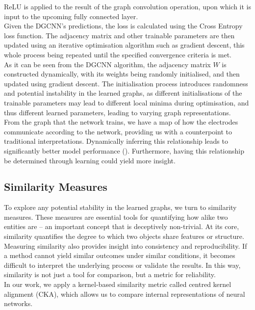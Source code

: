 \vspace{0.5em}
\noindent ReLU is applied to the result of the graph convolution operation, upon which it is input to the upcoming fully connected layer.
\vspace{0.5em}\\
Given the DGCNN's predictions, the loss is calculated using the Cross Entropy loss function. The adjacency matrix and other trainable parameters are then updated using an iterative optimisation algorithm such as gradient descent, this whole process being repeated until the specified convergence criteria is met.
\vspace{0.5em}\\
As it can be seen from the DGCNN algorithm, the adjacency matrix $W$ is constructed dynamically, with its weights being randomly initialised, and then updated using gradient descent.
The initialisation process introduces randomness and potential instability in the learned graphs, as different initialisations of the trainable parameters may lead to different local minima during optimisation, and thus different learned parameters, leading to varying graph representations.
\vspace{0.5em}\\
From the graph that the network trains, we have a map of how the electrodes communicate according to the network, providing us with a counterpoint to traditional interpretations. Dynamically inferring this relationship leads to significantly better model performance (\cite{Song}). Furthermore, having this relationship be determined through learning could yield more insight.

\subsection{Similarity Measures}
To explore any potential stability in the learned graphs, we turn to similarity measures. These measures are essential tools for quantifying how alike two entities are – an important concept that is deceptively non-trivial. At its core, similarity quantifies the degree to which two objects share features or structure.
\vspace{0.5em}\\
Measuring similarity also provides insight into consistency and reproducibility. If a method cannot yield similar outcomes under similar conditions, it becomes difficult to interpret the underlying process or validate the results. In this way, similarity is not just a tool for comparison, but a metric for reliability.
\vspace{0.5em}\\
In our work, we apply a kernel-based similarity metric called centred kernel alignment (CKA), which allows us to compare internal representations of neural networks.


